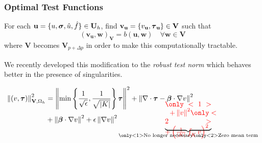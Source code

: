 \documentclass{beamer}
\begin{document}
\begin{frame}
\frametitle{Optimal Test Functions}
For each $\mathbf{u}=\{u,\boldsymbol\sigma,\hat u,\hat f\}\in\mathbf{U}_h$, find
$\mathbf{v}_{\mathbf{u}}=\{v_\mathbf{u},\boldsymbol\tau_\mathbf{u}\}\in\mathbf{V}$ such that
\[
(\mathbf{v_u},\mathbf{w})_\mathbf{V}=b(\mathbf{u},\mathbf{w})\quad\forall\mathbf{w}\in\mathbf{V}
\]
where $\mathbf{V}$ becomes $\mathbf{V}_{p+\Delta p}$ in order to make this
computationally tractable.

We recently developed this modification to the \emph{robust test norm}
\textsuperscript{\cite{ChanHeuerThanhDemkowicz2012}} which behaves better in
the presence of singularities.
\begin{minipage}[t][1.5in]{\textwidth}
\begin{align*}
\norm{(v,\bftau)}^2_{\mathbf{V},\Omega_h}&=
\norm{\min\left\{\frac{1}{\sqrt{\epsilon}},\frac{1}{\sqrt{|K|}}\right\}\bftau}^2
+\norm{\nabla\cdot\bftau-\bfbeta\cdot\nabla v}^2\\
&+\norm{\bfbeta\cdot\nabla v}^2+\epsilon\norm{\nabla v}^2
\underbrace{\color{red}{
\begin{minipage}[c][0.3in][c]{0.9in}$
\only<1>{
\hspace{1.5ex}
+\norm{v}^2
}
\only<2>{
+\left(\frac{1}{|K|}\int_Kv\right)^2
}$
\end{minipage}
}}_{\only<1>{\text{No longer necessary}}\only<2>{\text{Zero mean term}}}
\end{align*}
\end{minipage}
\end{frame}

\end{document}
